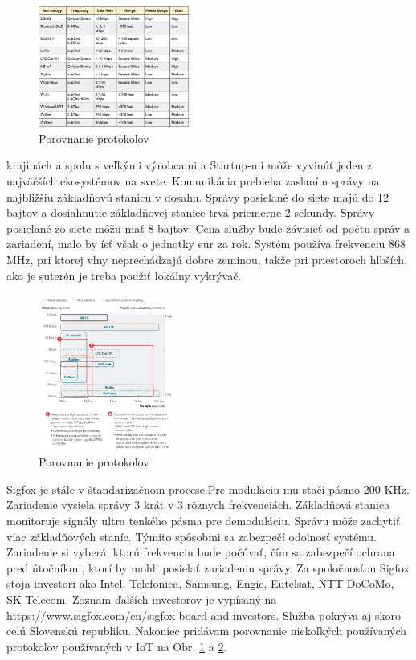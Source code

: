 \documentclass[../../main.tex]{subfiles}
\begin{document}
\noindent
\begin{figure}
 \centering
  \includegraphics[width=0.44\textwidth]{images/protocols_comparasion1.png}
  \caption{Porovnanie protokolov\cite{protocols_comparasion}}
    \label{fig:sigfox1}
\end{figure}
krajinách a spolu s veľkými výrobcami a Startup-mi môže vyvinúť jeden z najväčších ekosystémov na svete. Komunikácia prebieha zaslaním správy na najbližšiu základňovú stanicu v dosahu. Správy posielané do siete majú do 12 bajtov a dosiahnutie základňovej stanice trvá priemerne 2 sekundy. Správy posielané zo siete môžu mať 8 bajtov. Cena služby bude závisieť od počtu správ a zariadení, malo by ísť však o jednotky eur za rok. Systém používa frekvenciu 868 MHz, pri ktorej vlny neprechádzajú dobre zeminou, takže pri priestoroch hlbších, ako je suterén je treba použiť lokálny vykrývač.
 
\begin{figure}
 \centering
  \includegraphics[width=0.4\textwidth]{images/protocols_comparasion2.png}
  \caption{Porovnanie protokolov \cite{protocols_comparasion}}
    \label{fig:sigfox2}
\end{figure}
\noindent Sigfox je stále v štandarizačnom procese.Pre moduláciu mu stačí pásmo 200 KHz. Zariadenie vysiela správy 3 krát v 3 rôznych frekvenciách. Základňová stanica monitoruje signály ultra tenkého pásma pre demoduláciu. Správu môže zachytiť viac základňových staníc. Týmito spôsobmi sa zabezpečí odolnosť systému. Zariadenie si vyberá, ktorú frekvenciu bude počúvať, čím sa zabezpečí ochrana pred útočníkmi, ktorí by mohli posielať zariadeniu správy\cite{sigfox}. Za spoločnosťou Sigfox stoja investori ako Intel, Telefonica, Samsung, Engie, Eutelsat, NTT DoCoMo, SK Telecom. Zoznam ďalších investorov je vypísaný na \url{https://www.sigfox.com/en/sigfox-board-and-investors}. Služba pokrýva aj skoro celú Slovenskú republiku\cite{sigfox_sk}.
Nakoniec pridávam porovnanie niekoľkých používaných protokolov používaných v IoT na Obr. \ref{fig:sigfox1} a  \ref{fig:sigfox2}.
\end{document}

